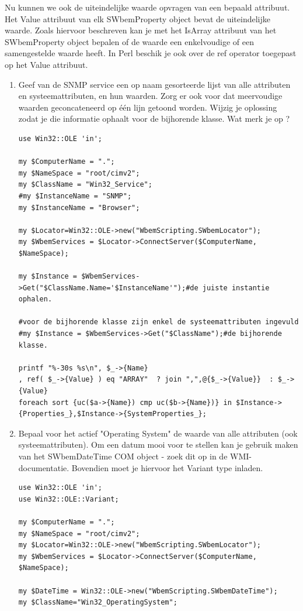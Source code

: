 \documentclass[11pt,a4paper]{report}
\begin{document}
Nu kunnen we ook de uiteindelijke waarde opvragen van een bepaald attribuut. Het Value attribuut van elk SWbemProperty object bevat de uiteindelijke waarde. Zoals hiervoor beschreven kan je met het IsArray attribuut van het SWbemProperty object bepalen of de waarde een enkelvoudige of een samengestelde waarde heeft. In Perl beschik je ook over de ref operator toegepast op het Value attribuut.
\begin{enumerate}[resume]
	\item Geef van de SNMP service een op naam gesorteerde lijst van alle attributen en systeemattributen, en hun waarden. Zorg er ook voor dat meervoudige waarden geconcateneerd op één lijn getoond worden.
	Wijzig je oplossing zodat je die informatie ophaalt voor de bijhorende klasse. Wat merk je op ?
	\begin{lstlisting}
use Win32::OLE 'in';

my $ComputerName = ".";
my $NameSpace = "root/cimv2";
my $ClassName = "Win32_Service";
#my $InstanceName = "SNMP";
my $InstanceName = "Browser";

my $Locator=Win32::OLE->new("WbemScripting.SWbemLocator");
my $WbemServices = $Locator->ConnectServer($ComputerName, $NameSpace);

my $Instance = $WbemServices->Get("$ClassName.Name='$InstanceName'");#de juiste instantie ophalen.

#voor de bijhorende klasse zijn enkel de systeemattributen ingevuld
#my $Instance = $WbemServices->Get("$ClassName");#de bijhorende klasse.

printf "%-30s %s\n", $_->{Name}
, ref( $_->{Value} ) eq "ARRAY"  ? join ",",@{$_->{Value}}  : $_->{Value}
foreach sort {uc($a->{Name}) cmp uc($b->{Name})} in $Instance->{Properties_},$Instance->{SystemProperties_};
	\end{lstlisting}
	\item Bepaal voor het actief "Operating System" de waarde van alle attributen (ook systeemattributen). Om een datum mooi voor te stellen kan je gebruik maken van het SWbemDateTime COM object - zoek dit op in de WMI-documentatie. Bovendien moet je hiervoor het Variant type inladen.
	\begin{lstlisting}
use Win32::OLE 'in';
use Win32::OLE::Variant;

my $ComputerName = ".";
my $NameSpace = "root/cimv2";
my $Locator=Win32::OLE->new("WbemScripting.SWbemLocator");
my $WbemServices = $Locator->ConnectServer($ComputerName, $NameSpace);

my $DateTime = Win32::OLE->new("WbemScripting.SWbemDateTime");
my $ClassName="Win32_OperatingSystem";


\end{lstlisting}
\end{enumerate}
\end{document}
